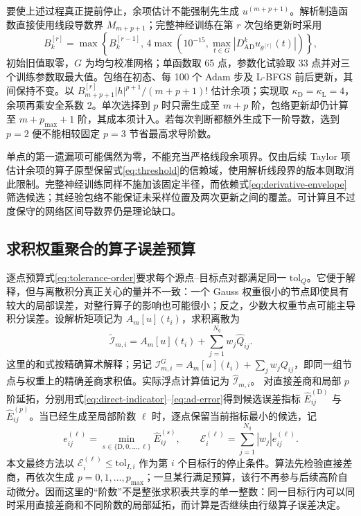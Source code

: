 \documentclass[UTF8,fontset=none,10.5pt,a4paper]{ctexart}
\numberwithin{equation}{section}
\begin{document}
要使上述过程真正提前停止，余项估计不能强制先生成 $u^{(m+p+1)}$。解析制造函数直接使用线段导数界 $M_{m+p+1}$；完整神经训练在第 $r$ 次包络更新时采用
\begin{equation}
B_k^{[r]}=\max\!\left\{B_k^{[r-1]},\,
4\max\!\left(10^{-15},\max_{t\in G}|D^k_{\mathrm{AD}}u_{\theta^{[r]}}(t)|\right)\right\},
\label{eq:derivative-envelope}
\end{equation}
初始旧值取零，$G$ 为均匀校准网格；单函数取 65 点，参数化试验取 33 点并对三个训练参数取最大值。包络在初态、每 100 个 Adam 步及 L-BFGS 前后更新，其间保持不变。以 $B_{m+p+1}^{[r]}|h|^{p+1}/(m+p+1)!$ 估计余项；实现取 $\kappa_{\mathrm D}=\kappa_{\mathrm L}=4$，余项再乘安全系数 2。单次选择到 $p$ 时只需生成至 $m+p$ 阶，包络更新却仍计算至 $m+p_{\max}+1$ 阶，其成本须计入。若每次判断都额外生成下一阶导数，选到 $p=2$ 便不能相较固定 $p=3$ 节省最高求导阶数。

单点的第一遗漏项可能偶然为零，不能充当严格线段余项界。仅由后续 Taylor 项估计余项的算子原型保留式\eqref{eq:threshold}的信赖域，使用解析线段界的版本则取消此限制。完整神经训练同样不施加该固定半径，而依赖式\eqref{eq:derivative-envelope}筛选候选；其经验包络不能保证未采样位置及两次更新之间的覆盖。可计算且不过度保守的网络区间导数界仍是理论缺口。

\subsection{求积权重聚合的算子误差预算}

逐点预算式\eqref{eq:tolerance-order}要求每个源点--目标点对都满足同一 $\mathrm{tol}_Q$。它便于解释，但与离散积分真正关心的量并不一致：一个 Gauss 权重很小的节点即使具有较大的局部误差，对整行算子的影响也可能很小；反之，少数大权重节点可能主导积分误差。设解析矩项记为 $A_m[u](t_i)$，求积离散为
\begin{equation}
\widetilde{\mathcal I}_{m,i}
=A_m[u](t_i)+\sum_{j=1}^{N_q}w_j\widehat Q_{ij}.
\label{eq:discrete-operator}
\end{equation}
这里的和式按精确算术解释；另记 $\mathcal I^G_{m,i}=A_m[u](t_i)+\sum_jw_jQ_{ij}$，即同一组节点与权重上的精确差商求积值。实际浮点计算值记为 $\widehat{\mathcal I}_{m,i}$。
对直接差商和局部 $p$ 阶延拓，分别用式\eqref{eq:direct-indicator}--\eqref{eq:ad-error}得到候选误差指标 $\widehat E_{ij}^{(\mathrm D)}$ 与 $\widehat E_{ij}^{(p)}$。当已经生成至局部阶数 $\ell$ 时，逐点保留当前指标最小的候选，记
\begin{equation}
e_{ij}^{(\ell)}=
\min_{s\in\{\mathrm D,0,\ldots,\ell\}}
\widehat E_{ij}^{(s)},
\qquad
\mathcal E_i^{(\ell)}=
\sum_{j=1}^{N_q}|w_j|e_{ij}^{(\ell)}.
\label{eq:operator-indicator}
\end{equation}
本文最终方法以 $\mathcal E_i^{(\ell)}\le\mathrm{tol}_{I,i}$ 作为第 $i$ 个目标行的停止条件。算法先检验直接差商，再依次生成 $p=0,1,\ldots,p_{\max}$；一旦某行满足预算，该行不再参与后续高阶自动微分。因而这里的“阶数”不是整张求积表共享的单一整数：同一目标行内可以同时采用直接差商和不同阶数的局部延拓，而计算是否继续由行级算子误差决定。
\end{document}
